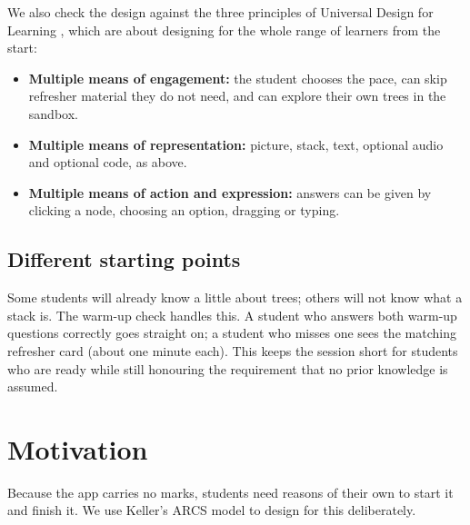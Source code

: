 \documentclass[11pt,a4paper]{article}
\begin{document}
We also check the design against the three principles of Universal Design for Learning
\cite{cast2018}, which are about designing for the whole range of learners from the start:

\begin{itemize}
  \item \textbf{Multiple means of engagement:} the student chooses the pace, can skip refresher
        material they do not need, and can explore their own trees in the sandbox.
  \item \textbf{Multiple means of representation:} picture, stack, text, optional audio and
        optional code, as above.
  \item \textbf{Multiple means of action and expression:} answers can be given by clicking a node,
        choosing an option, dragging or typing.
\end{itemize}

\subsection{Different starting points}

Some students will already know a little about trees; others will not know what a stack is. The
warm-up check handles this. A student who answers both warm-up questions correctly goes straight on;
a student who misses one sees the matching refresher card (about one minute each). This keeps the
session short for students who are ready while still honouring the requirement that no prior
knowledge is assumed.

\section{Motivation}
\label{sec:motivation}

Because the app carries no marks, students need reasons of their own to start it and finish it.
We use Keller's ARCS model \cite{keller1987} to design for this deliberately.
\end{document}
